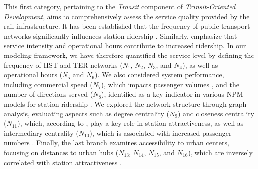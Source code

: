 \begin{refsegment}
This first category, pertaining to the \textsl{Transit} component of \textsl{Transit-Oriented Development}, aims to comprehensively assess the service quality provided by the rail infrastructure. It has been established that the frequency of public transport networks significantly influences station ridership \textcolor{blue}{\autocite[79]{sung_transit-oriented_2011}}. Similarly, \textcolor{blue}{\textcite[63]{kashfi_effects_2015}} emphasize that service intensity and operational hours contribute to increased ridership. In our modeling framework, we have therefore quantified the service level by defining the frequency of \acrshort{HST} and \acrshort{TER} networks (\(N_{1}\), \(N_{2}\), \(N_{3}\), and \(N_{4}\)), as well as operational hours (\(N_{5}\) and \(N_{6}\)). We also considered system performance, including commercial speed (\(N_{7}\)), which impacts passenger volumes \textcolor{blue}{\autocite[149-201]{vuchic_urban_2007}}, and the number of directions served (\(N_{8}\)), identified as a key indicator in various \acrshort{NPM} models for station ridership \textcolor{blue}{\autocite[9]{cao_coordination_2020}}. We explored the network structure through graph analysis, evaluating aspects such as degree centrality (\(N_{9}\)) and closeness centrality (\(N_{11}\)), which, according to \textcolor{blue}{\textcite[14]{shi_exploring_2018}}, play a key role in station attractiveness, as well as intermediary centrality (\(N_{10}\)), which is associated with increased passenger numbers \textcolor{blue}{\autocite[339]{jang_influence_2022}}. Finally, the last branch examines accessibility to urban centers, focusing on distances to urban hubs (\(N_{13}\), \(N_{14}\), \(N_{15}\), and \(N_{16}\)), which are inversely correlated with station attractiveness \textcolor{blue}{\autocites[8]{liu_how_2016}[241]{kuby_factors_2004}}.%



\end{refsegment}
